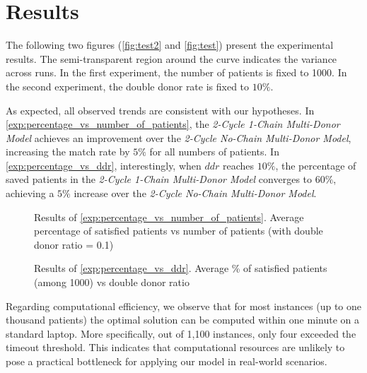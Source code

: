 \section{Results}


The following two figures (\autoref{fig:test2} and \autoref{fig:test}) present the experimental results. The semi-transparent region around the curve indicates the variance across runs. In the first experiment, the number of patients is fixed to 1000. In the second experiment, the double donor rate is fixed to $10\%$.

As expected, all observed trends are consistent with our hypotheses. In \autoref{exp:percentage_vs_number_of_patients}, the \textit{2-Cycle 1-Chain Multi-Donor Model} achieves an improvement over the \textit{2-Cycle No-Chain Multi-Donor Model}, increasing the match rate by $5\%$ for all numbers of patients. In \autoref{exp:percentage_vs_ddr}, interestingly, when $ddr$ reaches $10\%$, the percentage of saved patients in the \textit{2-Cycle 1-Chain Multi-Donor Model} converges to $60\%$, achieving a $5\%$ increase over the \textit{2-Cycle No-Chain Multi-Donor Model}.

\begin{figure}[H]
    \centering
    
    \caption[Average percentage of satisfied patients vs number of patients (with double donor ratio = 0.1)]{Results of \autoref{exp:percentage_vs_number_of_patients}. Average percentage of satisfied patients vs number of patients (with double donor ratio = 0.1)}
    \label{fig:test2}
\end{figure}

\begin{figure}[H]
    \centering
    
    \caption[Average \% of satisfied patients (among 1000) vs double donor ratio]{Results of \autoref{exp:percentage_vs_ddr}. Average \% of satisfied patients  (among 1000) vs double donor ratio}
    \label{fig:test}
\end{figure}


Regarding computational efficiency, we observe that for most instances (up to one thousand patients) the optimal solution can be computed within one minute on a standard laptop. More specifically, out of 1,100 instances, only four exceeded the timeout threshold. This indicates that computational resources are unlikely to pose a practical bottleneck for applying our model in real-world scenarios.


